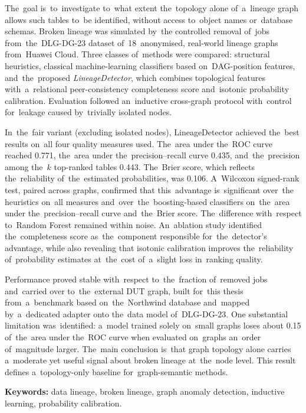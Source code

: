 \documentclass[polish,master,a4paper,oneside]{ppfcmthesis}
\renewcommand{\_}{\origtextunderscore\ifmmode\else\allowbreak\fi}
\begin{document}
The~goal is~to~investigate to~what extent the~topology alone of~a~lineage
graph allows such tables to~be identified, without access to~object names
or~database schemas. Broken lineage was simulated by~the controlled removal
of~jobs from~the~DLG-DG-23 dataset of~18~anonymised, real-world lineage graphs
from~Huawei Cloud. Three classes of~methods were compared: structural heuristics,
classical machine-learning classifiers based on~DAG-position features,
and~the~proposed \emph{LineageDetector}, which combines topological features
with~a~relational peer-consistency completeness score and~isotonic
probability calibration. Evaluation followed an~inductive cross-graph protocol
with~control for~leakage caused by~trivially isolated nodes.

In~the~fair variant (excluding isolated nodes), LineageDetector achieved
the~best results on~all four quality measures used. The~area under the~ROC
curve reached 0.771, the~area under the~precision–recall curve 0.435,
and~the~precision among the~$k$ top-ranked tables 0.443. The~Brier score,
which reflects the~reliability of~the~estimated probabilities, was 0.106.
A~Wilcoxon signed-rank test, paired across graphs, confirmed that
this~advantage is~significant over~the heuristics on~all measures
and~over~the~boosting-based classifiers on~the~area under the~precision–recall
curve and~the~Brier score. The~difference with~respect to~Random Forest remained within
noise. An~ablation study
identified the~completeness score as~the~component responsible
for~the~detector's advantage, while also revealing that isotonic calibration
improves the~reliability of~probability estimates at~the~cost of~a~slight
loss in~ranking quality.

Performance proved stable with~respect to~the~fraction of~removed jobs
and~carried over to~the~external DUT graph, built for~this thesis
from~a~benchmark based on~the~Northwind database and~mapped by~a~dedicated
adapter onto the~data model of~DLG-DG-23. One substantial limitation
was~identified: a~model trained solely on~small graphs loses about 0.15
of~the~area under the~ROC curve when evaluated on~graphs an~order
of~magnitude larger. The~main conclusion is~that graph topology alone carries
a~moderate yet useful signal about broken lineage at~the~node level. This
result defines a~topology-only baseline for~graph-semantic methods.

\vspace{1em}\noindent\textbf{Keywords:} data lineage, broken lineage, graph
anomaly detection, inductive learning, probability calibration.
\end{document}
